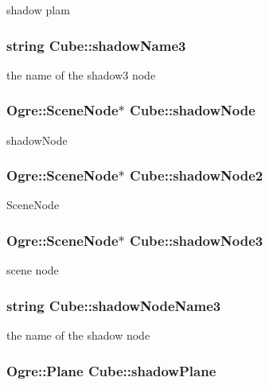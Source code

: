 shadow plam \hypertarget{class_cube_a3bb63d0dffdc360db0dee096083bd98d}{
\subsubsection[{shadow\-Name3}]{\setlength{\rightskip}{0pt plus 5cm}string Cube\-::shadow\-Name3}}\label{class_cube_a3bb63d0dffdc360db0dee096083bd98d}
the name of the shadow3 node \hypertarget{class_cube_a90a483946cdb6d20ae815ec9300a7dff}{
\subsubsection[{shadow\-Node}]{\setlength{\rightskip}{0pt plus 5cm}Ogre\-::\-Scene\-Node$\ast$ Cube\-::shadow\-Node}}\label{class_cube_a90a483946cdb6d20ae815ec9300a7dff}
shadow\-Node \hypertarget{class_cube_ab0dd9287bdc0dd3d3c86720b8063e1c7}{
\subsubsection[{shadow\-Node2}]{\setlength{\rightskip}{0pt plus 5cm}Ogre\-::\-Scene\-Node$\ast$ Cube\-::shadow\-Node2}}\label{class_cube_ab0dd9287bdc0dd3d3c86720b8063e1c7}
Scene\-Node \hypertarget{class_cube_a46e45c5df1c3b06a722792c0fe7a3a99}{
\subsubsection[{shadow\-Node3}]{\setlength{\rightskip}{0pt plus 5cm}Ogre\-::\-Scene\-Node$\ast$ Cube\-::shadow\-Node3}}\label{class_cube_a46e45c5df1c3b06a722792c0fe7a3a99}
scene node \hypertarget{class_cube_ac59874f591b123fc0f0d7b4c88ab9130}{
\subsubsection[{shadow\-Node\-Name3}]{\setlength{\rightskip}{0pt plus 5cm}string Cube\-::shadow\-Node\-Name3}}\label{class_cube_ac59874f591b123fc0f0d7b4c88ab9130}
the name of the shadow node \hypertarget{class_cube_a9f4a7fe70d1017e112c5486268ccde48}{
\subsubsection[{shadow\-Plane}]{\setlength{\rightskip}{0pt plus 5cm}Ogre\-::\-Plane Cube\-::shadow\-Plane}}\label{class_cube_a9f4a7fe70d1017e112c5486268ccde48}
